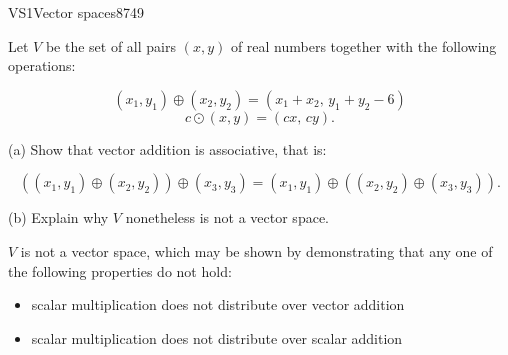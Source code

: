 \begin{exercise}{VS1}{Vector spaces}{8749} 
\begin{exerciseStatement} 

 Let \(V\) be the set of all pairs \((x,y)\) of real numbers together with the following operations: 

 \[(x_1,y_1)\oplus (x_2,y_2)=\left(x_{1} + x_{2},\,y_{1} + y_{2} - 6\right)\]\[c \odot (x,y) =\left(c x,\,c y\right).\] 

 (a) Show that vector addition is associative, that is: 

 \[
      \left((x_1,y_1)\oplus(x_2,y_2)\right)\oplus(x_3,y_3)=(x_1,y_1)\oplus\left((x_2,y_2)\oplus(x_3,y_3)\right).
    \] 

 (b) Explain why \(V\) nonetheless is not a vector space. 

 \end{exerciseStatement}
 \begin{exerciseAnswer} 

 \(V\) is not a vector space, which may be shown by demonstrating that any one of the following properties do not hold: 

 

\begin{itemize}
\item scalar multiplication does not distribute over vector addition
\item scalar multiplication does not distribute over scalar addition
\end{itemize}

     \end{exerciseAnswer}
 \end{exercise}


